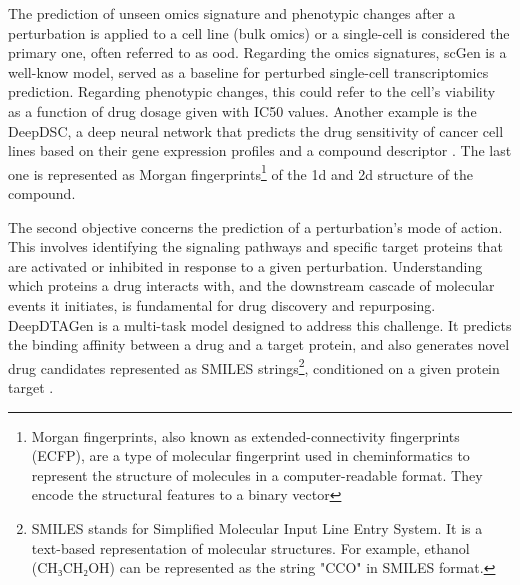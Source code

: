 \documentclass[12pt, a4paper]{article}
\begin{document}
The prediction of unseen omics signature and phenotypic changes after a perturbation is applied to a cell line (bulk omics) or a single-cell is considered the primary one, often referred to as \gls{ood}. Regarding the omics signatures, scGen is a well-know model, served as a baseline for perturbed single-cell transcriptomics prediction. Regarding phenotypic changes, this could refer to the cell's viability as a function of drug dosage given with IC50 values. Another example is the DeepDSC, a deep neural network that predicts the drug sensitivity of cancer cell lines based on their gene expression profiles and a compound descriptor \cite{li2019deepdsc}. The last one is represented as Morgan fingerprints\footnote{Morgan fingerprints, also known as extended-connectivity fingerprints (ECFP), are a type of molecular fingerprint used in cheminformatics to represent the structure of molecules in a computer-readable format. They encode the structural features to a binary vector\cite{morgan1965generation}} of the 1d and 2d structure of the compound.



The second objective concerns the prediction of a perturbation's mode of action. This involves identifying the signaling pathways and specific target proteins that are activated or inhibited in response to a given perturbation. Understanding which proteins a drug interacts with, and the downstream cascade of molecular events it initiates, is fundamental for drug discovery and repurposing.
DeepDTAGen is a multi-task model designed to address this challenge. It predicts the binding affinity between a drug and a target protein, and also generates novel drug candidates represented as SMILES strings\footnote{SMILES stands for Simplified Molecular Input Line Entry System. It is a text-based representation of molecular structures. For example, ethanol (CH₃CH₂OH) can be represented as the string "CCO" in SMILES format.}, conditioned on a given protein target \cite{shah2025deepdtagen}.
\end{document}

